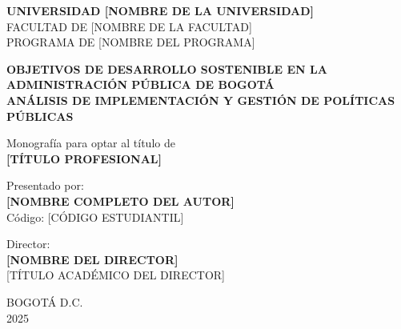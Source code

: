 \begin{titlepage}
    \centering
    
    
    {\large\textbf{UNIVERSIDAD [NOMBRE DE LA UNIVERSIDAD]}\\[0.5cm]}
    {\large FACULTAD DE [NOMBRE DE LA FACULTAD]\\[0.5cm]}
    {\large PROGRAMA DE [NOMBRE DEL PROGRAMA]\\[2cm]}
    
    {\huge\textbf{OBJETIVOS DE DESARROLLO SOSTENIBLE EN LA ADMINISTRACIÓN PÚBLICA DE BOGOTÁ}\\[0.5cm]}
    {\Large\textbf{ANÁLISIS DE IMPLEMENTACIÓN Y GESTIÓN DE POLÍTICAS PÚBLICAS}\\[3cm]}
    
    {\large Monografía para optar al título de\\[0.3cm]}
    {\large\textbf{[TÍTULO PROFESIONAL]}\\[2cm]}
    
    {\large Presentado por:\\[0.3cm]}
    {\large\textbf{[NOMBRE COMPLETO DEL AUTOR]}\\[0.3cm]}
    {\large Código: [CÓDIGO ESTUDIANTIL]\\[2cm]}
    
    {\large Director:\\[0.3cm]}
    {\large\textbf{[NOMBRE DEL DIRECTOR]}\\[0.3cm]}
    {\large [TÍTULO ACADÉMICO DEL DIRECTOR]\\[3cm]}
    
    {\large BOGOTÁ D.C.\\[0.3cm]}
    {\large 2025}
    
\end{titlepage}
